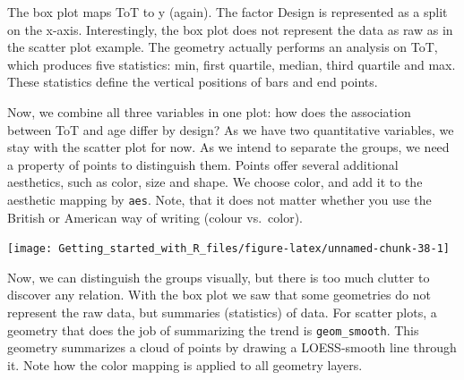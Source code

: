 \documentclass[]{svmono}
\newenvironment{Shaded}{\begin{snugshade}}{\end{snugshade}}
\newcommand{\KeywordTok}[1]{\textcolor[rgb]{0.13,0.29,0.53}{\textbf{#1}}}
\newcommand{\DataTypeTok}[1]{\textcolor[rgb]{0.13,0.29,0.53}{#1}}
\newcommand{\StringTok}[1]{\textcolor[rgb]{0.31,0.60,0.02}{#1}}
\newcommand{\OperatorTok}[1]{\textcolor[rgb]{0.81,0.36,0.00}{\textbf{#1}}}
\newcommand{\NormalTok}[1]{#1}
\begin{document}
The box plot maps ToT to y (again). The factor Design is represented as
a split on the x-axis. Interestingly, the box plot does not represent
the data as raw as in the scatter plot example. The geometry actually
performs an analysis on ToT, which produces five statistics: min, first
quartile, median, third quartile and max. These statistics define the
vertical positions of bars and end points.

Now, we combine all three variables in one plot: how does the
association between ToT and age differ by design? As we have two
quantitative variables, we stay with the scatter plot for now. As we
intend to separate the groups, we need a property of points to
distinguish them. Points offer several additional aesthetics, such as
color, size and shape. We choose color, and add it to the aesthetic
mapping by \texttt{aes}. Note, that it does not matter whether you use
the British or American way of writing (colour vs.~color).

\begin{Shaded}
\end{Shaded}

\texttt{[image: Getting\_started\_with\_R\_files/figure-latex/unnamed-chunk-38-1]}

Now, we can distinguish the groups visually, but there is too much
clutter to discover any relation. With the box plot we saw that some
geometries do not represent the raw data, but summaries (statistics) of
data. For scatter plots, a geometry that does the job of summarizing the
trend is \texttt{geom\_smooth}. This geometry summarizes a cloud of
points by drawing a LOESS-smooth line through it. Note how the color
mapping is applied to all geometry layers.

\begin{Shaded}
\end{Shaded}
\end{document}
